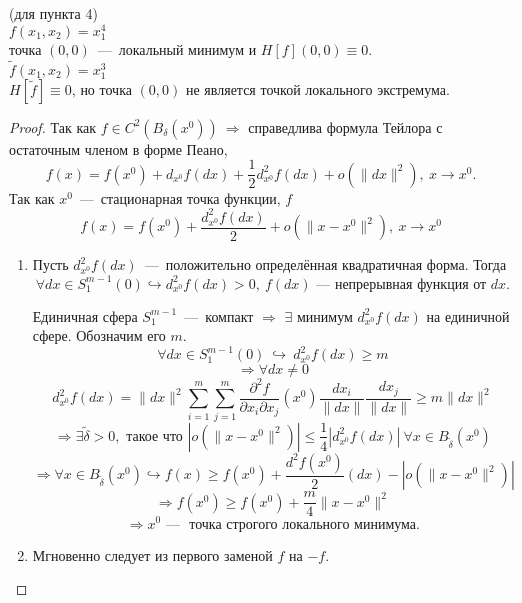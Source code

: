 \begin{example} (для пункта 4) \\
    $f(x_1, x_2) = x_1^4$ \\
    точка $(0, 0)$~---~локальный минимум и $H[f] (0, 0) \equiv 0$. \\
    $\widetilde{f}(x_1, x_2) = x_1^3$ \\
    $H[\widetilde{f}] \equiv 0$, но точка $(0, 0)$ не является точкой локального экстремума.
\end{example}

\begin{proof}
    Так как $f \in C^2\left(B_{\delta}(x^0)\right) \ \Longrightarrow$ справедлива формула Тейлора с остаточным членом в форме Пеано,
    $$ f(x) = f(x^0) + d_{x^0} f(dx) + \dfrac{1}{2} d^2_{x^0} f(dx) + o(\| dx \| ^2), \ x \to x^0 .$$
    Так как $x^0$~---~стационарная точка функции, $f$ 
    $$ f(x) = f(x^0) + \dfrac{ d^2_{x^0} f(dx)}{2} + o(\| x - x^0\| ^2), \ x \to x^0 $$

\begin{enumerate}
    \item Пусть $d^2_{x^0} f(dx)$~---~положительно определённая квадратичная форма. Тогда
    $$ \forall dx \in S_1^{m-1}(0) \hookrightarrow d^2_{x^0} f(dx) > 0, \ f(dx)\text{~---~непрерывная функция от } dx.$$

    Единичная сфера $S_1^{m-1}$~---~компакт $\Longrightarrow$ $\exists$ минимум $d^2_{x^0} f(dx)$ на единичной сфере. Обозначим его $m$. \\
    $$ \forall dx \in S_1^{m-1}(0) \ \hookrightarrow \ d^2_{x^0} f(dx) \geq m$$
    $$ \Longrightarrow \forall dx \neq 0$$
    $$ d^2_{x^0} f(dx) = \| dx \|^2  \sum\limits_{i=1}^m \sum\limits_{j=1}^m \dfrac{\partial^2 f}{\partial x_i \partial x_j} (x^0) \dfrac{dx_i}{\|dx\|} \dfrac{dx_j}{\|dx\|} \geq m \|dx\|^2 $$
    $$ \Longrightarrow \exists \widetilde{\delta} > 0, \text{ такое что } \left|o(\| x - x^0 \|^2)\right| \leq \dfrac{1}{4} \left| d^2_{x^0} f(dx) \right| \ \forall x \in B_{\widetilde{\delta}} (x^0)$$
    $$ \Longrightarrow \forall x \in B_{\widetilde{\delta}}(x^0) \hookrightarrow f(x) \geq f(x^0) + \dfrac{d^2 f(x^0)}{2}(dx) - \left|o(\| x - x^0 \|^2)\right| $$
    $$ \Longrightarrow f(x^0) \geq f(x^0) + \dfrac{m}{4} \| x - x^0 \|^2$$
    $$ \Longrightarrow x^0 \text{~---~ точка строгого локального минимума}.$$

    \item Мгновенно следует из первого заменой $f$ на $-f$.


\end{enumerate}
\end{proof}
